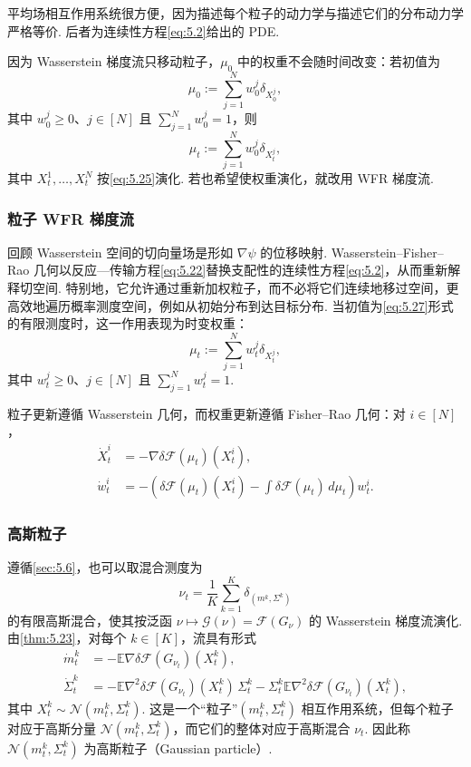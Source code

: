 平均场相互作用系统很方便，因为描述每个粒子的动力学与描述它们的分布动力学严格等价. 后者为连续性方程\eqref{eq:5.2}给出的 PDE.

因为 Wasserstein 梯度流只移动粒子，$\mu_0$ 中的权重不会随时间改变：若初值为
\begin{equation}\label{eq:5.27}
\mu_0:=\sum_{j=1}^Nw_0^j\delta_{X_0^j},
\end{equation}
其中 $w_0^j\geq0$、$j\in[N]$ 且 $\sum_{j=1}^Nw_0^j=1$，则
$$
\mu_t:=\sum_{j=1}^Nw_0^j\delta_{X_t^j},
$$
其中 $X_t^1,\ldots,X_t^N$ 按\eqref{eq:5.25}演化. 若也希望使权重演化，就改用 WFR 梯度流.

\subsubsection{粒子 WFR 梯度流}\label{sec:5.8.2}

回顾 Wasserstein 空间的切向量场是形如 $\nabla\psi$ 的位移映射. Wasserstein--Fisher--Rao 几何以反应—传输方程\eqref{eq:5.22}替换支配性的连续性方程\eqref{eq:5.2}，从而重新解释切空间. 特别地，它允许通过重新加权粒子，而不必将它们连续地移过空间，更高效地遍历概率测度空间，例如从初始分布到达目标分布. 当初值为\eqref{eq:5.27}形式的有限测度时，这一作用表现为时变权重：
$$
\mu_t:=\sum_{j=1}^Nw_t^j\delta_{X_t^j},
$$
其中 $w_t^j\geq0$、$j\in[N]$ 且 $\sum_{j=1}^Nw_t^j=1$.

粒子更新遵循 Wasserstein 几何，而权重更新遵循 Fisher--Rao 几何：对 $i\in[N]$，
\begin{equation}\label{eq:5.28}
\begin{aligned}
\dot X_t^i&=-\nabla\delta\mathcal F(\mu_t)(X_t^i),\\
\dot w_t^i&=-\left(\delta\mathcal F(\mu_t)(X_t^i)
-\int\delta\mathcal F(\mu_t)\,d\mu_t\right)w_t^i.
\end{aligned}
\end{equation}

\subsubsection{高斯粒子}\label{sec:5.8.3}

遵循\autoref{sec:5.6}，也可以取混合测度为
$$
\nu_t=\frac1K\sum_{k=1}^K\delta_{(m^k,\Sigma^k)}
$$
的有限高斯混合，使其按泛函 $\nu\mapsto\mathcal G(\nu)=\mathcal F(G_\nu)$ 的 Wasserstein 梯度流演化. 由\autoref{thm:5.23}，对每个 $k\in[K]$，流具有形式
\begin{equation}\label{eq:5.29}
\begin{aligned}
\dot m_t^k&=-\mathbb E\nabla\delta\mathcal F(G_{\nu_t})(X_t^k),\\
\dot\Sigma_t^k&=-\mathbb E\nabla^2\delta\mathcal F(G_{\nu_t})(X_t^k)\,\Sigma_t^k
-\Sigma_t^k\mathbb E\nabla^2\delta\mathcal F(G_{\nu_t})(X_t^k),
\end{aligned}
\end{equation}
其中 $X_t^k\sim\mathcal N(m_t^k,\Sigma_t^k)$. 这是一个“粒子”$(m_t^k,\Sigma_t^k)$ 相互作用系统，但每个粒子对应于高斯分量 $\mathcal N(m_t^k,\Sigma_t^k)$，而它们的整体对应于高斯混合 $\nu_t$. 因此称 $\mathcal N(m_t^k,\Sigma_t^k)$ 为高斯粒子（Gaussian particle）.

